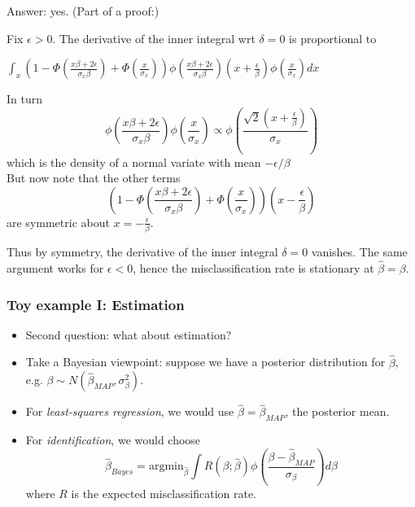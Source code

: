 \documentclass{beamer}
\newcommand{\argmin}{\text{argmin}}
\begin{document}
\begin{frame}
Answer: yes.  (Part of a proof:)

Fix $\epsilon > 0$.
The derivative of the inner integral wrt $\delta = 0$ is proportional to
\begin{center}
$\int_x (1 - \Phi(\frac{x\beta + 2\epsilon}{\sigma_x \beta}) + \Phi(\frac{x}{\sigma_x})) \phi(\frac{x\beta + 2\epsilon}{\sigma_x \beta})(x + \frac{\epsilon}{\beta}) \phi(\frac{x}{\sigma_x}) dx
$\end{center}
In turn
\[
\phi\left(\frac{x\beta + 2\epsilon}{\sigma_x \beta}\right)
\phi\left(\frac{x}{\sigma_x}\right) \propto 
\phi\left(\frac{\sqrt{2} (x + \frac{\epsilon}{\beta})}{\sigma_x}\right)
\]
which is the density of a normal variate with mean $-\epsilon/\beta$\\

But now note that the other terms
\[
\left(1 - \Phi\left(\frac{x\beta + 2\epsilon}{\sigma_x \beta}\right)
 + \Phi\left(\frac{x}{\sigma_x}\right)\right)
\left(x - \frac{\epsilon}{\beta}\right)
\]
are symmetric about $x = -\frac{\epsilon}{\beta}$.

Thus by symmetry, the derivative of the inner integral $\delta = 0$ vanishes.
The same argument works for $\epsilon < 0$, hence the misclassification rate is stationary at $\hat{\beta} = \beta$.
\end{frame}

\begin{frame}
\frametitle{Toy example I: Estimation}
\begin{itemize}
\item Second question: what about estimation?
\item Take a Bayesian viewpoint: suppose we have a posterior distribution for $\hat{\beta}$, e.g. $\beta \sim N(\hat{\beta}_{MAP}, \sigma^2_\beta)$.
\item For \emph{least-squares regression}, we would use $\hat{\beta} = \hat{\beta}_{MAP}$, the posterior mean.
\item For \emph{identification}, we would choose
\[
\hat{\beta}_{Bayes} = \argmin_{\hat{\beta}} \int R(\beta; \hat{\beta}) \phi\left(\frac{\beta - \hat{\beta}_{MAP}}{\sigma_\beta}\right) d\beta
\]
where $R$ is the expected misclassification rate.
\end{itemize}
\end{frame}
\end{document}
